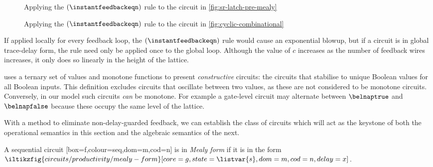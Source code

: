 \documentclass{lmcs}
\begin{document}
\begin{figure}
    \centering
    \caption{
        Applying the \((\instantfeedbackeqn)\) rule to the circuit in
        \autoref{fig:sr-latch-pre-mealy}
    }
    \label{fig:sr-latch-unrolled}
\end{figure}
%
\begin{figure}
    \centering
    \caption{
        Applying the \((\instantfeedbackeqn)\) rule to the circuit in
        \autoref{fig:cyclic-combinational}
    }
    \label{fig:cyclic-combinational-unrolled}
\end{figure}

If applied locally for every feedback loop, the \((\instantfeedbackeqn)\)
rule would cause an exponential blowup, but if a circuit is in global
trace-delay form, the rule need only be applied once to the global loop.
Although the value of \(c\) increases as the number of feedback wires increases,
it only does so linearly in the height of the lattice.

\begin{rem}
    \cite{mendler2012constructive} uses a ternary set of values and monotone
    functions to present \emph{constructive} circuits: the circuits
    that stabilise to unique Boolean values for all Boolean inputs.
    This definition excludes circuits that oscillate between two values, as
    these are not considered to be monotone circuits.
    Conversely, in our model such circuits \emph{can} be monotone.
    For example a gate-level circuit may alternate between \(\belnaptrue\) and
    \(\belnapfalse\) because these occupy the same level of the lattice.
\end{rem}

With a method to eliminate non-delay-guarded feedback, we can establish the
class of circuits which will act as the keystone of both the operational
semantics in this section and the algebraic semantics of the next.

\begin{defi}\label{def:delay-guarded}
    A sequential circuit
    [box=f,colour=seq,dom=m,cod=n]
    is in \emph{Mealy form} if it is in the form \(
    \iltikzfig{circuits/productivity/mealy-form}[core=g,state=\listvar{s},dom=m,cod=n,delay=x]
    \).
\end{defi}
\end{document}
